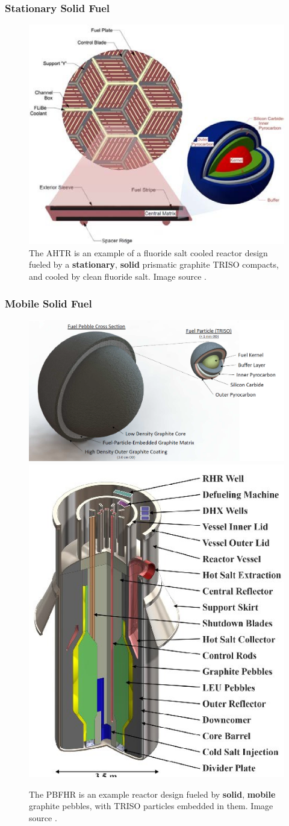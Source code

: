 \begin{frame}
        \frametitle{Stationary Solid Fuel}
               \begin{figure}[t]
                \vspace*{-0.1in}
                \includegraphics[height=0.5\textwidth]{./images/example-ahtr.png}
                       \caption{The \gls{AHTR} \cite{forsberg_fuel_2004} 
                       is an example of a fluoride salt cooled reactor 
                       design fueled by a \textbf{stationary}, \textbf{solid} 
                       prismatic graphite TRISO compacts, and cooled by clean fluoride salt.
                       Image source \cite{gentry_burnable_2015}. }
               \end{figure}            
\end{frame}

\begin{frame}
        \frametitle{Mobile Solid Fuel}
               \begin{figure}[t]
                \vspace*{-0.1in}
                \includegraphics[height=0.2\textwidth]{./images/example-pbfhr-fuel.png}
                \includegraphics[height=0.4\textwidth]{./images/example-pbfhr-core.jpg}
                       \caption{The \gls{PBFHR} is an example reactor design 
                       fueled by \textbf{solid}, \textbf{mobile} graphite 
                       pebbles, with TRISO particles embedded in them. Image 
                       source \cite{andreades_technical_2014}.}
               \end{figure}            
\end{frame}

